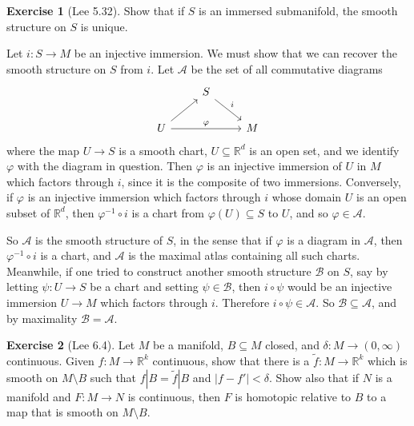 \documentclass[10pt]{article}
\newcommand{\RR}{\mathbb{R}}
\theoremstyle{definition}
\newtheorem{exer}{Exercise}
\begin{document}
\begin{exer}[Lee 5.32]
Show that if $S$ is an immersed submanifold, the smooth structure on $S$ is unique.
\end{exer}

Let $i: S \to M$ be an injective immersion.
We must show that we can recover the smooth structure on $S$ from $i$.
Let $\mathcal A$ be the set of all commutative diagrams
$$\begin{tikzcd}
&S \arrow[dr,"i"] \\
U \arrow[ur] \arrow[rr,"\varphi"] && M
\end{tikzcd}$$
where the map $U \to S$ is a smooth chart, $U \subseteq \RR^d$ is an open set, and we identify $\varphi$ with the diagram in question.
Then $\varphi$ is an injective immersion of $U$ in $M$ which factors through $i$, since it is the composite of two immersions.
Conversely, if $\varphi$ is an injective immersion which factors through $i$ whose domain $U$ is an open subset of $\RR^d$, then $\varphi^{-1} \circ i$ is a chart from $\varphi(U) \subseteq S$ to $U$, and so $\varphi \in \mathcal A$.

So $\mathcal A$ is the smooth structure of $S$, in the sense that if $\varphi$ is a diagram in $\mathcal A$, then $\varphi^{-1} \circ i$ is a chart, and $\mathcal A$ is the maximal atlas containing all such charts.
Meanwhile, if one tried to construct another smooth structure $\mathcal B$ on $S$, say by letting $\psi: U \to S$ be a chart and setting $\psi \in \mathcal B$, then $i \circ \psi$ would be an injective immersion $U \to M$ which factors through $i$. Therefore $i \circ \psi \in \mathcal A$.
So $\mathcal B \subseteq \mathcal A$, and by maximality $\mathcal B = \mathcal A$.

\begin{exer}[Lee 6.4]
Let $M$ be a manifold, $B \subseteq M$ closed, and $\delta: M \to (0, \infty)$ continuous.
Given $f: M \to \RR^k$ continuous, show that there is a $\tilde f: M \to \RR^k$ which is smooth on $M \setminus B$ such that $f|B = \tilde f|B$ and $|f - f'| < \delta$.
Show also that if $N$ is a manifold and $F: M \to N$ is continuous, then $F$ is homotopic relative to $B$ to a map that is smooth on $M \setminus B$.
\end{exer}
\end{document}
